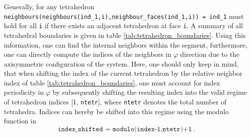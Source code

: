 \documentclass[./main.tex]{subfiles}
\begin{document}
Generally, for any tetrahedron \texttt{neighbours(neighbours(ind\_1,i),neighbour\_faces(ind\_1,i)) = ind\_1} must hold for all \texttt{i} if there exists an adjacent tetrahedron at face \texttt{i}.
A summary of all tetrahedral boundaries is given in table \ref{tab:tetrahedron_boundaries}. Using this information, one can find the internal neighbors within the segment, furthermore, one can directly compute the indices of the neighbors in $\varphi$ direction due to the axisymmetric configuration of the system. Here, one should only keep in mind, that when shifting the index of the current tetrahedron by the relative neighbor index of table \ref{tab:tetrahedron_boundaries}, one must account for index periodicity in $\varphi$ by subsequently shifting the resulting index into the valid regime of tetrahedron indices [1, \texttt{ntetr}], where \texttt{ntetr} denotes the total number of tetrahedra. Indices can hereby be shifted into this regime using the modulo function in
\[\texttt{index\_shifted = modulo(index-1,ntetr)+1}~.\]     
\end{document}
